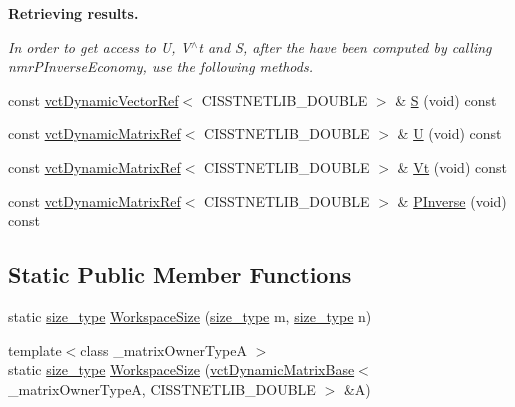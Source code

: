 \begin{Indent}{\bf Retrieving results.}\par
{\em In order to get access to U, V$^\wedge$t and S, after the have been computed by calling nmr\+P\+Inverse\+Economy, use the following methods. }\begin{DoxyCompactItemize}
\item 
const \hyperlink{classvct_dynamic_vector_ref}{vct\+Dynamic\+Vector\+Ref}$<$ C\+I\+S\+S\+T\+N\+E\+T\+L\+I\+B\+\_\+\+D\+O\+U\+B\+L\+E $>$ \& \hyperlink{classnmr_p_inverse_economy_dynamic_data_a26c147031eb1e598986be57d7a35c2a7}{S} (void) const 
\item 
const \hyperlink{classvct_dynamic_matrix_ref}{vct\+Dynamic\+Matrix\+Ref}$<$ C\+I\+S\+S\+T\+N\+E\+T\+L\+I\+B\+\_\+\+D\+O\+U\+B\+L\+E $>$ \& \hyperlink{classnmr_p_inverse_economy_dynamic_data_af9d54fcba81ce6fc2f3a0aa4962e4919}{U} (void) const 
\item 
const \hyperlink{classvct_dynamic_matrix_ref}{vct\+Dynamic\+Matrix\+Ref}$<$ C\+I\+S\+S\+T\+N\+E\+T\+L\+I\+B\+\_\+\+D\+O\+U\+B\+L\+E $>$ \& \hyperlink{classnmr_p_inverse_economy_dynamic_data_a7ed2916c0f61e4097800ed3b7f548c3d}{Vt} (void) const 
\item 
const \hyperlink{classvct_dynamic_matrix_ref}{vct\+Dynamic\+Matrix\+Ref}$<$ C\+I\+S\+S\+T\+N\+E\+T\+L\+I\+B\+\_\+\+D\+O\+U\+B\+L\+E $>$ \& \hyperlink{classnmr_p_inverse_economy_dynamic_data_a9e07241a84c9b0f93f785246ea587b58}{P\+Inverse} (void) const 
\end{DoxyCompactItemize}
\end{Indent}
\subsection*{Static Public Member Functions}
\begin{DoxyCompactItemize}
\item 
static \hyperlink{classnmr_p_inverse_economy_dynamic_data_a32ab8d601abf927292b49d0cea124f9b}{size\+\_\+type} \hyperlink{classnmr_p_inverse_economy_dynamic_data_a157edf445675cef52065e27cd674a8cb}{Workspace\+Size} (\hyperlink{classnmr_p_inverse_economy_dynamic_data_a32ab8d601abf927292b49d0cea124f9b}{size\+\_\+type} m, \hyperlink{classnmr_p_inverse_economy_dynamic_data_a32ab8d601abf927292b49d0cea124f9b}{size\+\_\+type} n)
\item 
{\footnotesize template$<$class \+\_\+matrix\+Owner\+Type\+A $>$ }\\static \hyperlink{classnmr_p_inverse_economy_dynamic_data_a32ab8d601abf927292b49d0cea124f9b}{size\+\_\+type} \hyperlink{classnmr_p_inverse_economy_dynamic_data_af2e31c82ffaef1be276bff9d009e338a}{Workspace\+Size} (\hyperlink{classvct_dynamic_matrix_base}{vct\+Dynamic\+Matrix\+Base}$<$ \+\_\+matrix\+Owner\+Type\+A, C\+I\+S\+S\+T\+N\+E\+T\+L\+I\+B\+\_\+\+D\+O\+U\+B\+L\+E $>$ \&A)
\end{DoxyCompactItemize}
